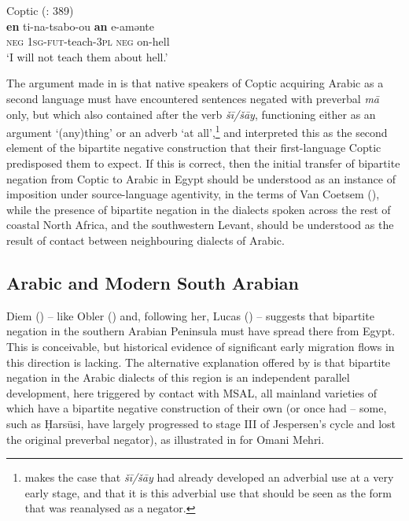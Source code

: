 \documentclass[output=paper]{langsci/langscibook}
\begin{document}
\ea\label{cop}
{       Coptic (\citealt{LucasLash2010}: 389)}\\
\gll \textbf{en} ti-na-tsabo-ou \textbf{an} e-amənte\\
     \textsc{neg} \textsc{1sg-fut-}teach-\textsc{3pl} \textsc{neg} on-hell\\
\glt ‘I will not teach them about hell.’
\z

The argument made in \citet{LucasLash2010} is that native speakers of Coptic acquiring Arabic as a second language must have encountered sentences negated with preverbal \textit{mā} only, but which also contained after the verb \textit{šī/šāy}, functioning either as an argument ‘(any)thing’ or an adverb ‘at all’,\footnote{\citet{Diem2014} makes the case that \textit{šī/šāy} had already developed an adverbial use at a very early stage, and that it is this adverbial use that should be seen as the form that was reanalysed as a negator.} and interpreted this as the second element of the bipartite negative construction that their first-language Coptic predisposed them to expect. If this is correct, then the initial transfer of bipartite negation from Coptic to Arabic in Egypt should be understood as an instance of imposition under source-language agentivity, in the terms of Van Coetsem (\citeyear{VanCoetsem1988,VanCoetsem2000}), while the presence of bipartite negation in the dialects spoken across the rest of coastal North Africa, and the southwestern Levant, should be understood as the result of contact between neighbouring dialects of Arabic.



\subsection{Arabic and Modern South Arabian}


Diem (\citeyear[73]{Diem2014}) -- like Obler (\citeyear[148]{Obler1990}) and, following her, Lucas (\citeyear[416]{Lucas2007}) -- suggests that bipartite negation in the southern Arabian Peninsula must have spread there from Egypt. This is conceivable, but historical evidence of significant early migration flows in this direction is lacking. The alternative explanation offered by \citet{LucasLash2010} is that bipartite negation in the Arabic dialects of this region is an independent parallel development, here triggered by contact with MSAL, all mainland varieties of which have a bipartite negative construction of their own (or once had – some, such as Ḥarsūsi, have largely progressed to stage III of Jespersen’s cycle and lost the original preverbal negator), as illustrated in  for Omani Mehri.
\end{document}
